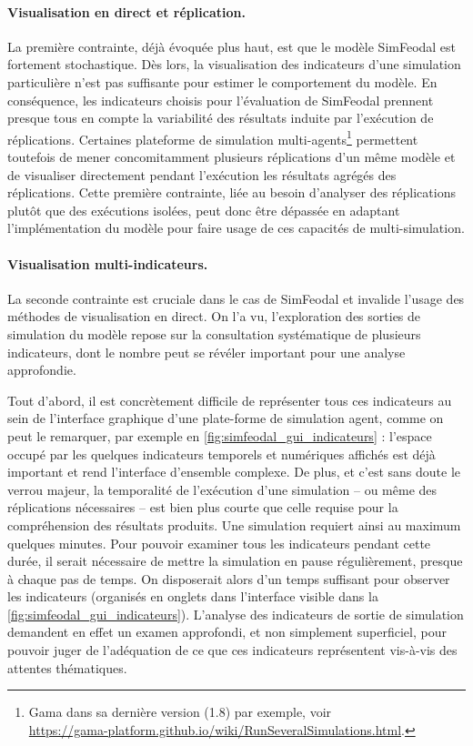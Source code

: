 \paragraph{Visualisation en direct et réplication.}

La première contrainte, déjà évoquée plus haut, est que le modèle SimFeodal est fortement stochastique.
Dès lors, la visualisation des indicateurs d'une simulation particulière n'est pas suffisante pour estimer le comportement du modèle.
En conséquence, les indicateurs choisis pour l'évaluation de SimFeodal prennent presque tous en compte la variabilité des résultats induite par l'exécution de réplications.
Certaines plateforme de simulation multi-agents\footnote{
	Gama dans sa dernière version (1.8) par exemple, voir\\ \href{https://gama-platform.github.io/wiki/RunSeveralSimulations.html}{https://gama-platform.github.io/wiki/RunSeveralSimulations.html}.
} permettent toutefois de mener concomitamment plusieurs réplications d'un même modèle et de visualiser directement pendant l'exécution les résultats agrégés des réplications.
Cette première contrainte, liée au besoin d'analyser des réplications plutôt que des exécutions isolées, peut donc être dépassée en adaptant l'implémentation du modèle pour faire usage de ces capacités de multi-simulation.

\paragraph{Visualisation multi-indicateurs.}

La seconde contrainte est cruciale dans le cas de SimFeodal et invalide l'usage des méthodes de visualisation en direct.
On l'a vu, l'exploration des sorties de simulation du modèle repose sur la consultation systématique de plusieurs indicateurs, dont le nombre peut se révéler important pour une analyse approfondie.

Tout d'abord, il est concrètement difficile de représenter tous ces indicateurs au sein de l'interface graphique d'une plate-forme de simulation agent, comme on peut le remarquer, par exemple en \cref{fig:simfeodal_gui_indicateurs} : l'espace occupé par les quelques indicateurs temporels et numériques affichés est déjà important et rend l'interface d'ensemble complexe.
De plus, et c'est sans doute le verrou majeur, la temporalité de l'exécution d'une simulation -- ou même des réplications nécessaires -- est bien plus courte que celle requise pour la compréhension des résultats produits.
Une simulation requiert ainsi au maximum quelques minutes.
Pour pouvoir examiner tous les indicateurs pendant cette durée, il serait nécessaire de mettre la simulation en pause régulièrement, presque à chaque pas de temps.
On disposerait alors d'un temps suffisant pour observer les indicateurs (organisés en onglets dans l'interface visible dans la \cref{fig:simfeodal_gui_indicateurs}).
L'analyse des indicateurs de sortie de simulation demandent en effet un examen approfondi, et non simplement superficiel, pour pouvoir juger de l'adéquation de ce que ces indicateurs représentent vis-à-vis des attentes thématiques.

